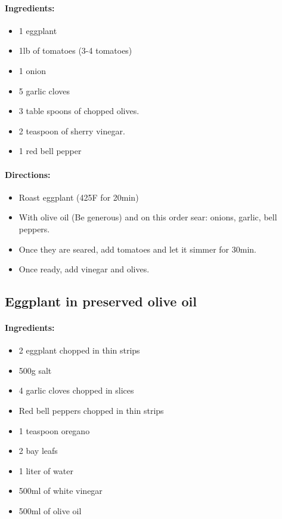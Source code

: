 \documentclass{article}
\begin{document}
\paragraph{Ingredients:}

\begin{itemize}
	\item 1 eggplant
	\item 1lb of tomatoes (3-4 tomatoes)
	\item 1 onion
	\item 5 garlic cloves
	\item 3 table spoons of chopped olives.
	\item 2 teaspoon of sherry vinegar.
	\item 1 red bell pepper
\end{itemize}

\paragraph{Directions:}
\begin{itemize}
	\item Roast eggplant (425F for 20min)
	\item With olive oil (Be generous) and on this order sear: onions, garlic, bell peppers.
	\item Once they are seared, add tomatoes and let it simmer for 30min.
	\item Once ready, add vinegar and olives.
\end{itemize}

\subsection{Eggplant in preserved olive oil}{}

\paragraph{Ingredients:}

\begin{itemize}
	\item 2 eggplant chopped in thin strips
	\item 500g salt
	\item 4 garlic cloves chopped in slices
	\item Red bell peppers chopped in thin strips
	\item 1 teaspoon oregano
	\item 2 bay leafs
	\item 1 liter of water
	\item 500ml of white vinegar
	\item 500ml of olive oil
\end{itemize}
\end{document}
